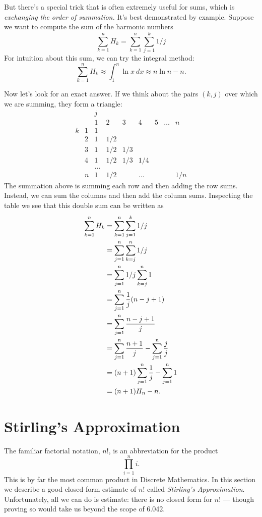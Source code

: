 But there's a special trick that is often extremely useful for sums,
which is \emph{exchanging the order of summation.}  It's best
demonstrated by example.  Suppose we want to compute the sum of the
harmonic numbers
\[
\sum_{k=1}^n H_k = \sum_{k=1}^n \sum_{j=1}^k 1/j
\]
For intuition about this sum, we can try the integral method:
\[
\sum_{k=1}^n H_k \approx \int_{1}^n \ln x \ dx \approx n\ln n-n.
\]

Now let's look for an exact answer.  If we think about the pairs
$(k,j)$ over which we are summing, they form a triangle:
\[
\begin{array}{cc|ccccccc}
 &  & j &   &   &   &   &       &   \\
 &  & 1 & 2 & 3 & 4 & 5 & \dots & n \\
\hline
k & 1 & 1\\
  & 2 &1&1/2\\
  & 3 &1&1/2&1/3\\
  & 4 &1&1/2&1/3&1/4\\
  &   &\dots\\
  & n &1&1/2&&\dots&&&1/n
\end{array}
\]
The summation above is summing each row and then adding the row sums.
Instead, we can sum the columns and then add the column sums.
Inspecting the table we see that this double sum can be written as
\begin{align}
\sum_{k=1}^n H_k &= \sum_{k=1}^n \sum_{j=1}^k 1/j\notag\\
&= \sum_{j=1}^n \sum_{k=j}^n 1/j\notag\\
&= \sum_{j=1}^n 1/j \sum_{k=j}^n 1\notag\\
&= \sum_{j=1}^n \frac1j (n-j+1)\notag\\
&= \sum_{j=1}^n \frac{n-j+1}j \notag\\
&= \sum_{j=1}^n \frac{n+1}j - \sum_{j=1}^n \frac{j}{j}\notag\\
&= (n+1)\sum_{j=1}^n \frac1j - \sum_{j=1}^n 1\notag\\
&= (n+1)H_n-n.\label{sHk}
\end{align}
\fi


\section{Stirling's Approximation}\label{Stirling_sec}

The familiar factorial notation, $n!$, is an abbreviation for the product
\[
\prod_{i=1}^n i.
\]
This is by far the most common product in Discrete Mathematics.  In this
section we describe a good closed-form estimate of $n!$ called
\emph{Stirling's Approximation}.  Unfortunately, all we can do is
estimate: there is no closed form for $n!$ --- though proving so would
take us beyond the scope of 6.042.

